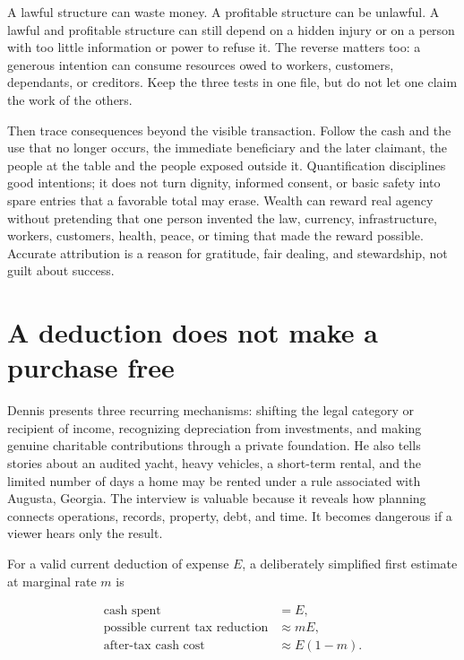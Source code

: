 A lawful structure can waste money. A profitable structure can be unlawful. A
lawful and profitable structure can still depend on a hidden injury or on a
person with too little information or power to refuse it. The reverse matters
too: a generous intention can consume resources owed to workers, customers,
dependants, or creditors. Keep the three tests in one file, but do not let one
claim the work of the others.

Then trace consequences beyond the visible transaction. Follow the cash and
the use that no longer occurs, the immediate beneficiary and the later
claimant, the people at the table and the people exposed outside it.
Quantification disciplines good intentions; it does not turn dignity, informed
consent, or basic safety into spare entries that a favorable total may erase.
Wealth can reward real agency without pretending that one person invented the
law, currency, infrastructure, workers, customers, health, peace, or timing
that made the reward possible. Accurate attribution is a reason for gratitude,
fair dealing, and stewardship, not guilt about success.

\section{A deduction does not make a purchase free}

Dennis presents three recurring mechanisms: shifting the legal category or
recipient of income, recognizing depreciation from investments, and making
genuine charitable contributions through a private foundation. He also tells
stories about an audited yacht, heavy vehicles, a short-term rental, and the
limited number of days a home may be rented under a rule associated with
Augusta, Georgia. The interview is valuable because it reveals how planning
connects operations, records, property, debt, and time. It becomes dangerous
if a viewer hears only the result.

For a valid current deduction of expense \(E\), a deliberately simplified
first estimate at marginal rate \(m\) is

\begin{equation}
\begin{aligned}
\text{cash spent}&=E,\\
\text{possible current tax reduction}&\approx mE,\\
\text{after-tax cash cost}&\approx E(1-m).
\end{aligned}
\end{equation}

